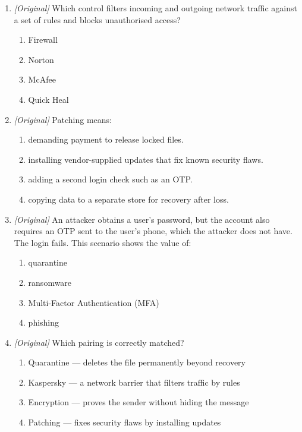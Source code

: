 \documentclass[11pt]{article}
\begin{document}
\begin{enumerate}[label=\textbf{Q\arabic*.}, leftmargin=*]
\begin{enumerate}[label=\Alph*.]
    \item data in transit, by providing a secure encrypted channel.
    \item login accounts, by demanding an OTP at every step.
    \item software flaws, by installing vendor-supplied updates.
  \end{enumerate}
\item \textit{[Original]} Which control filters incoming and outgoing
  network traffic against a set of rules and blocks unauthorised access?
  \begin{enumerate}[label=\Alph*.]
    \item Firewall
    \item Norton
    \item McAfee
    \item Quick Heal
  \end{enumerate}
\item \textit{[Original]} Patching means:
  \begin{enumerate}[label=\Alph*.]
    \item demanding payment to release locked files.
    \item installing vendor-supplied updates that fix known security flaws.
    \item adding a second login check such as an OTP.
    \item copying data to a separate store for recovery after loss.
  \end{enumerate}
\item \textit{[Original]} An attacker obtains a user's password, but the
  account also requires an OTP sent to the user's phone, which the attacker
  does not have. The login fails. This scenario shows the value of:
  \begin{enumerate}[label=\Alph*.]
    \item quarantine
    \item ransomware
    \item Multi-Factor Authentication (MFA)
    \item phishing
  \end{enumerate}
\item \textit{[Original]} Which pairing is correctly matched?
  \begin{enumerate}[label=\Alph*.]
    \item Quarantine --- deletes the file permanently beyond recovery
    \item Kaspersky --- a network barrier that filters traffic by rules
    \item Encryption --- proves the sender without hiding the message
    \item Patching --- fixes security flaws by installing updates
  \end{enumerate}


\end{enumerate}
\end{document}
